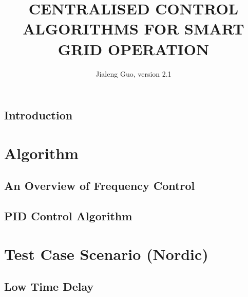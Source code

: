 \documentclass[12pt]{report}
\begin{document}
\title{CENTRALISED CONTROL ALGORITHMS FOR SMART GRID OPERATION}
\author{Jialeng Guo, version 2.1}



\beforepreface
\hypersetup{linkcolor=magenta}

\hypersetup{linkcolor=.}

\afterpreface
\hypersetup{linkcolor=magenta}



\chapter{Introduction}
\label{chapter:intro}





\part{Algorithm}

\chapter{An Overview of Frequency Control}
\label{Chapter2}


\chapter{PID Control Algorithm}
\label{Chapter3}







\part{Test Case Scenario (Nordic)}

\chapter{Low Time Delay}
\label{Chapter4}





\end{document}
